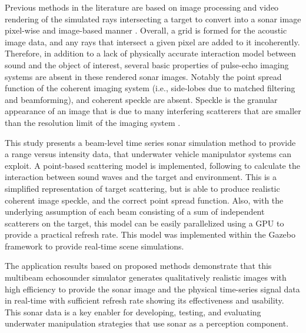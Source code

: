 \documentclass[utf8]{frontiersSCNS} %
\begin{document}
Previous methods in the literature are based on image processing and video rendering of the simulated rays intersecting a target to convert into a sonar image pixel-wise and image-based manner \citep{demarco15computationally, cerqueira17novel, cerqueira20rasterized}. Overall, a grid is formed for the acoustic image data, and any rays that intersect a given pixel are added to it incoherently. Therefore, in addition to a lack of physically accurate interaction model between sound and the object of interest, several basic properties of pulse-echo imaging systems are absent in these rendered sonar images. Notably the point spread function of the coherent imaging system (i.e., side-lobes due to matched filtering and beamforming), and coherent speckle are absent. Speckle is the granular appearance of an image that is due to many interfering scatterers that are smaller than the resolution limit of the imaging system \citep{goodman2015statistical}. 

This study presents a beam-level time series sonar simulation method to provide a range versus intensity data, that underwater vehicle manipulator systems can exploit. A point-based scattering model is implemented, following \cite{brown17point} to calculate the interaction between sound waves and the target and environment. This is a simplified representation of target scattering, but is able to produce realistic coherent image speckle, and the correct point spread function. Also, with the underlying assumption of each beam consisting of a sum of independent scatterers on the target, this model can be easily parallelized using a GPU to provide a practical refresh rate. This model was implemented within the Gazebo framework to provide real-time scene simulations.

The application results based on proposed methods demonstrate that this multibeam echosounder simulator generates qualitatively realistic images with high efficiency to provide the sonar image and the physical time-series signal data in real-time with sufficient refresh rate showing its effectiveness and usability. This sonar data is a key enabler for developing, testing, and evaluating underwater manipulation strategies that use sonar as a perception component.
\end{document}
